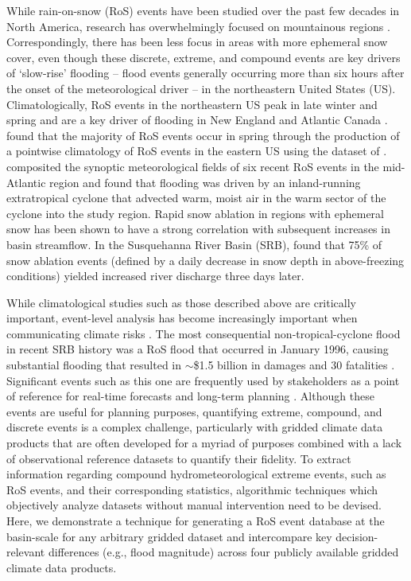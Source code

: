 \documentclass[draft]{agujournal2019}
\begin{document}
While rain-on-snow (RoS) events have been studied over the past few decades in North America, research has overwhelmingly focused on mountainous regions \citep{singh1997hydrological,mccabe2007rain,musselman2018projected}. 
Correspondingly, there has been less focus in areas with more ephemeral snow cover, even though these discrete, extreme, and compound events are key drivers of `slow-rise' flooding -- flood events generally occurring more than six hours after the onset of the meteorological driver \citep{dougherty2021high} -- in the northeastern United States (US). 
Climatologically, RoS events in the northeastern US peak in late winter and spring \citep{ashley2008flood,villarini2010flood,dougherty2019climatology} and are a key driver of flooding in New England and Atlantic Canada \citet{collins2014annual}. 
\citet{wachowicz2020rain} found that the majority of RoS events occur in spring through the production of a pointwise climatology of RoS events in the eastern US using the dataset of \citet{dyer2006spatial}. \citet{grote2021synoptic} composited the synoptic meteorological fields of six recent RoS events in the mid-Atlantic region and found that flooding was driven by an inland-running extratropical cyclone that advected warm, moist air in the warm sector of the cyclone into the study region. 
Rapid snow ablation in regions with ephemeral snow has been shown to have a strong correlation with subsequent increases in basin streamflow. 
In the Susquehanna River Basin (SRB), \citet{suriano2020discharge} found that 75\% of snow ablation events (defined by a daily decrease in snow depth in above-freezing conditions) yielded increased river discharge three days later.

While climatological studies such as those described above are critically important, event-level analysis has become increasingly important when communicating climate risks \citep{shepherd2018storylines}. 
The most consequential non-tropical-cyclone flood in recent SRB history was a RoS flood that occurred in January 1996, causing substantial flooding that resulted in $\sim$\$1.5 billion in damages and 30 fatalities \citep{leathers1998severe}.
Significant events such as this one are frequently used by stakeholders as a point of reference for real-time forecasts and long-term planning \citep{george2019the}. 
Although these events are useful for planning purposes, quantifying extreme, compound, and discrete events is a complex challenge, particularly with gridded climate data products that are often developed for a myriad of purposes combined with a lack of observational reference datasets to quantify their fidelity. 
To extract information regarding compound hydrometeorological extreme events, such as RoS events, and their corresponding statistics, algorithmic techniques which objectively analyze datasets without manual intervention need to be devised.
Here, we demonstrate a technique for generating a RoS event database at the basin-scale for any arbitrary gridded dataset and intercompare key decision-relevant differences (e.g., flood magnitude) across four publicly available gridded climate data products. 
\end{document}
